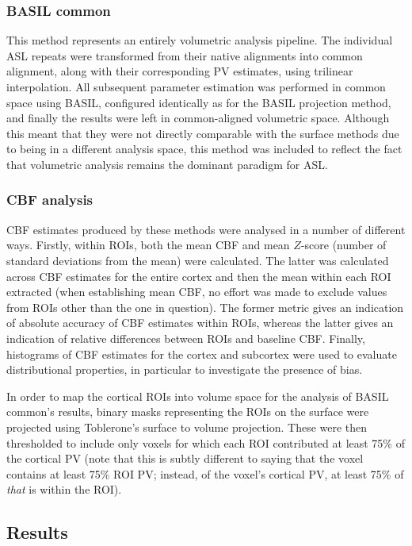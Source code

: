 \subsubsection{BASIL common}

This method represents an entirely volumetric analysis pipeline. The individual ASL repeats were transformed from their native alignments into common alignment, along with their corresponding PV estimates, using trilinear interpolation. All subsequent parameter estimation was performed in common space using BASIL, configured identically as for the BASIL projection method, and finally the results were left in common-aligned volumetric space. Although this meant that they were not directly comparable with the surface methods due to being in a different analysis space, this method was included to reflect the fact that volumetric analysis remains the dominant paradigm for ASL. 

\subsubsection{CBF analysis} 

CBF estimates produced by these methods were analysed in a number of different ways. Firstly, within ROIs, both the mean CBF and mean $Z$-score (number of standard deviations from the mean) were calculated. The latter was calculated across CBF estimates for the entire cortex and then the mean within each ROI extracted (when establishing mean CBF, no effort was made to exclude values from ROIs other than the one in question). The former metric gives an indication of absolute accuracy of CBF estimates within ROIs, whereas the latter gives an indication of relative differences between ROIs and baseline CBF. Finally, histograms of CBF estimates for the cortex and subcortex were used to evaluate distributional properties, in particular to investigate the presence of bias. 

In order to map the cortical ROIs into volume space for the analysis of BASIL common's results, binary masks representing the ROIs on the surface were projected using Toblerone's surface to volume projection. These were then thresholded to include only voxels for which each ROI contributed at least 75\% of the cortical PV (note that this is subtly different to saying that the voxel contains at least 75\% ROI PV; instead, of the voxel's cortical PV, at least 75\% of \textit{that} is within the ROI).

\subsection{Results}

